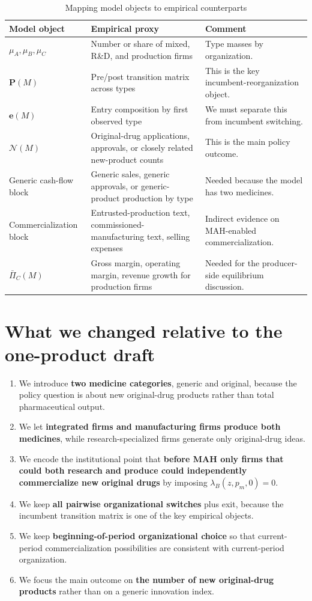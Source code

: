 \documentclass[12pt]{article}
\newcommand{\1}{\mathbf{1}}
\newcommand{\Inew}{\mathcal{N}}
\begin{document}
\begin{table}[htbp]
\centering
\caption{Mapping model objects to empirical counterparts}
\label{tab:mapping}
\begin{tabular}{p{}p{}p{}}
\toprule
Model object & Empirical proxy & Comment \\
\midrule
$\mu_A,\mu_B,\mu_C$ & Number or share of mixed, R\&D, and production firms & Type masses by organization. \\
$\mathbf P(M)$ & Pre/post transition matrix across types & This is the key incumbent-reorganization object. \\
$\mathbf e(M)$ & Entry composition by first observed type & We must separate this from incumbent switching. \\
$\Inew(M)$ & Original-drug applications, approvals, or closely related new-product counts & This is the main policy outcome. \\
Generic cash-flow block & Generic sales, generic approvals, or generic-product production by type & Needed because the model has two medicines. \\
Commercialization block & Entrusted-production text, commissioned-manufacturing text, selling expenses & Indirect evidence on MAH-enabled commercialization. \\
$\bar\Pi_C(M)$ & Gross margin, operating margin, revenue growth for production firms & Needed for the producer-side equilibrium discussion. \\
\bottomrule
\end{tabular}
\end{table}

\section{What we changed relative to the one-product draft}

\begin{enumerate}[leftmargin=2em]
    \item We introduce \textbf{two medicine categories}, generic and original, because the policy question is about new original-drug products rather than total pharmaceutical output.
    \item We let \textbf{integrated firms and manufacturing firms produce both medicines}, while research-specialized firms generate only original-drug ideas.
    \item We encode the institutional point that \textbf{before MAH only firms that could both research and produce could independently commercialize new original drugs} by imposing $\lambda_B(z,p_m,0)=0$.
    \item We keep \textbf{all pairwise organizational switches} plus exit, because the incumbent transition matrix is one of the key empirical objects.
    \item We keep \textbf{beginning-of-period organizational choice} so that current-period commercialization possibilities are consistent with current-period organization.
    \item We focus the main outcome on \textbf{the number of new original-drug products} rather than on a generic innovation index.
\end{enumerate}
\end{document}
